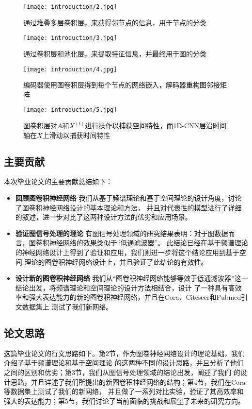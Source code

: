 \begin{figure}[htbp]
    \centering
    \begin{minipage}[t]{0.48\textwidth}
    \centering
    \captionsetup{width=5cm}
    \texttt{[image: introduction/2.jpg]}
    \caption{\label{1-2}通过堆叠多层卷积层，来获得邻节点的信息，用于节点的分类}
    \end{minipage}
    \begin{minipage}[t]{0.48\textwidth}
    \centering
    \captionsetup{width=5cm}
    \texttt{[image: introduction/3.jpg]}
    \caption{\label{1-3}通过卷积层和池化层，来提取特征信息，并最终用于图的分类}
    \end{minipage}
\end{figure}
\begin{figure}[htbp]
    \centering
    \begin{minipage}[t]{0.48\textwidth}
    \centering
    \captionsetup{width=5cm}
    \texttt{[image: introduction/4.jpg]}
    \caption{\label{1-4}编码器使用图卷积层得到每个节点的网络嵌入，解码器重构图邻接矩阵}
    \end{minipage}
    \begin{minipage}[t]{0.48\textwidth}
    \centering
    \captionsetup{width=5cm}
    \texttt{[image: introduction/5.jpg]}
    \caption{\label{1-5}图卷积层对$A$和$X^(t)$进行操作以捕获空间特性，而1D-CNN层沿时间轴在$X$上滑动以捕获时间特性}
    \end{minipage}
\end{figure}

\subsection{主要贡献}
本次毕业论文的主要贡献总结如下：
\begin{itemize}
    \item \textbf{回顾图卷积神经网络} \quad
    我们从基于频谱理论和基于空间理论的设计角度，讨论了图卷积神经网络设计的基本理论和方法，
    并且对代表性的模型进行了详细的叙述，进一步对比了这两种设计方法的优劣和应用场景。

    \item \textbf{验证图信号处理的理论} \quad
    有图信号处理领域的研究结果表明：对于图数据而言，图卷积神经网络的效果类似于“低通滤波器”。
    此结论已经在基于频谱理论的神经网络设计上得到了验证和应用，我们则进一步将这个结论应用到基于空间
    理论的图卷积神经网络设计上，并且验证了此结论的有效性。

    \item \textbf{设计新的图卷积神经网络} \quad
    我们从“图卷积神经网络能够等效于低通滤波器”这一结论出发，将频谱理论和空间理论的设计方法相结合，设计
    了一种具有高效率和强大表达能力的新的图卷积神经网络，并且在Cora、Citeseer和Pubmed引文数据集上
    测试了我们新网络。
\end{itemize}

\subsection{论文思路}
这篇毕业论文的行文思路如下。第2节，作为图卷神经网络设计的理论基础，我们介绍了基于频谱理论和基于空间理论
的这两种不同的设计思路，并且分析了他们之间的区别和优劣；第3节，我们从图信号处理领域的结论出发，阐述了我们
的设计思路，并且详述了我们所提出的新图卷积神经网络的结构；第4节，我们在Cora等数据集上测试了我们的新网络，
并且做了一系列对比实验，验证了其高效率和强大的表达能力；第5节，我们讨论了当前面临的挑战和展望了未来的研究方向。